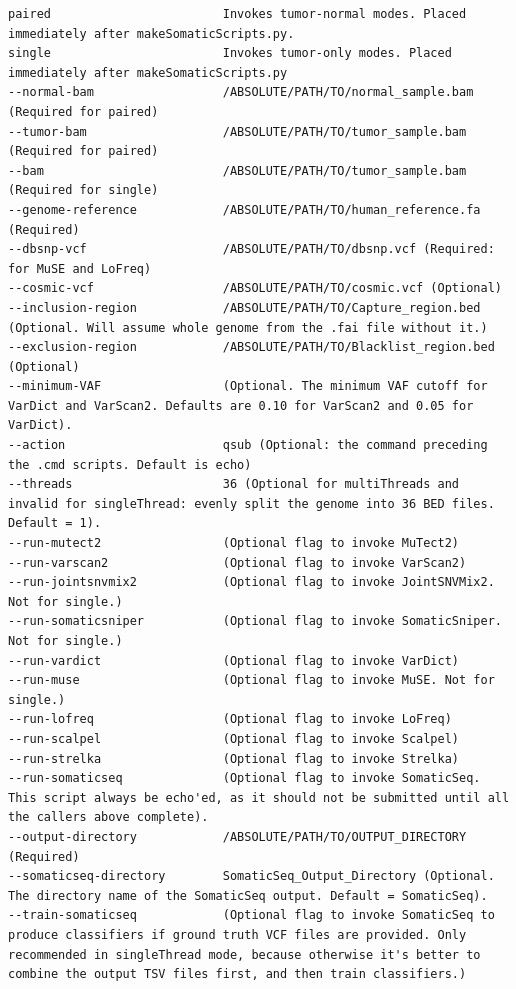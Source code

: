\documentclass[10pt,letterpaper]{article}
\begin{document}
\begin{sloppypar}
\begin{lstlisting}
paired                        Invokes tumor-normal modes. Placed immediately after makeSomaticScripts.py.
single                        Invokes tumor-only modes. Placed immediately after makeSomaticScripts.py
--normal-bam                  /ABSOLUTE/PATH/TO/normal_sample.bam (Required for paired)
--tumor-bam                   /ABSOLUTE/PATH/TO/tumor_sample.bam (Required for paired)
--bam                         /ABSOLUTE/PATH/TO/tumor_sample.bam (Required for single)
--genome-reference            /ABSOLUTE/PATH/TO/human_reference.fa (Required)
--dbsnp-vcf                   /ABSOLUTE/PATH/TO/dbsnp.vcf (Required: for MuSE and LoFreq)
--cosmic-vcf                  /ABSOLUTE/PATH/TO/cosmic.vcf (Optional)
--inclusion-region            /ABSOLUTE/PATH/TO/Capture_region.bed (Optional. Will assume whole genome from the .fai file without it.)
--exclusion-region            /ABSOLUTE/PATH/TO/Blacklist_region.bed (Optional)
--minimum-VAF                 (Optional. The minimum VAF cutoff for VarDict and VarScan2. Defaults are 0.10 for VarScan2 and 0.05 for VarDict).
--action                      qsub (Optional: the command preceding the .cmd scripts. Default is echo)
--threads                     36 (Optional for multiThreads and invalid for singleThread: evenly split the genome into 36 BED files. Default = 1).
--run-mutect2                 (Optional flag to invoke MuTect2)
--run-varscan2                (Optional flag to invoke VarScan2)
--run-jointsnvmix2            (Optional flag to invoke JointSNVMix2. Not for single.)
--run-somaticsniper           (Optional flag to invoke SomaticSniper. Not for single.)
--run-vardict                 (Optional flag to invoke VarDict)
--run-muse                    (Optional flag to invoke MuSE. Not for single.)
--run-lofreq                  (Optional flag to invoke LoFreq)
--run-scalpel                 (Optional flag to invoke Scalpel)
--run-strelka                 (Optional flag to invoke Strelka)
--run-somaticseq              (Optional flag to invoke SomaticSeq. This script always be echo'ed, as it should not be submitted until all the callers above complete).
--output-directory            /ABSOLUTE/PATH/TO/OUTPUT_DIRECTORY (Required)
--somaticseq-directory        SomaticSeq_Output_Directory (Optional. The directory name of the SomaticSeq output. Default = SomaticSeq).
--train-somaticseq            (Optional flag to invoke SomaticSeq to produce classifiers if ground truth VCF files are provided. Only recommended in singleThread mode, because otherwise it's better to combine the output TSV files first, and then train classifiers.)

\end{lstlisting}
\end{sloppypar}
\end{document}
